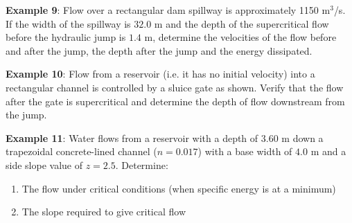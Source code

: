 \documentclass[10pt, oneside]{amsart}
\begin{document}







\vfill
\pagebreak



\textbf{Example 9}:
Flow over a rectangular dam spillway is approximately 1150 m$^3$/s. If the width of the spillway is
$32.0\mbox{ m}$ and the depth of the supercritical flow before the hydraulic jump is $1.4$ m,
determine the velocities of the flow before and after the jump, the depth after the jump
and the energy dissipated.
\vfill\pagebreak

\vfill
\pagebreak


\textbf{Example 10}:
Flow from a reservoir (i.e. it has no initial velocity) into a rectangular channel is controlled by a sluice gate as shown. Verify that the flow after the gate is supercritical and determine the depth of flow downstream from the jump.
\vfill\pagebreak



\textbf{Example 11}:
Water flows from a reservoir with a depth of 3.60 m down a trapezoidal concrete-lined channel ($n=0.017$) with a base width of $4.0$ m and a side slope value of $z=2.5$.\parm
Determine:
\begin{enumerate}
	\item The flow under critical conditions (when specific energy is at a minimum)
	\item The slope required to give critical flow
\end{enumerate}
\vfill\pagebreak
\end{document}
